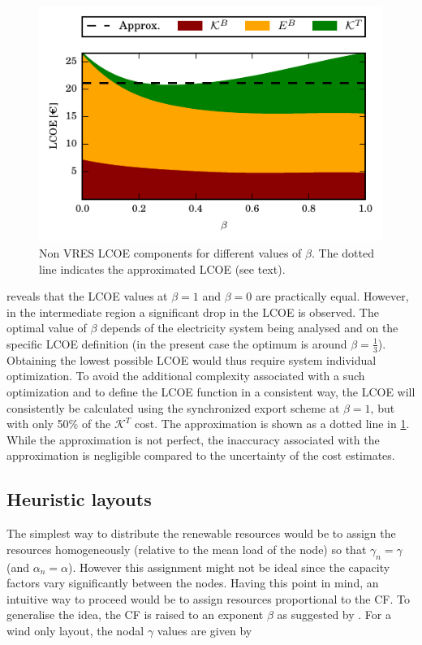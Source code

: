 \documentclass[a4paper, 5p, sort&compress]{elsarticle}%
\begin{document}
\begin{figure}[h!]
  \centering
  \includegraphics[width = \columnwidth]{constrainedSync}
  \caption{Non VRES LCOE components for different values of $\beta$. The
    dotted line indicates the approximated LCOE (see text).}
  \label{fig:transmission-lcoe}
\end{figure}

 reveals that the LCOE values at
$\beta = 1$ and $\beta = 0$ are practically equal. However, in the
intermediate region a significant drop in the LCOE is observed. The
optimal value of $\beta$ depends of the electricity system being analysed
and on the specific LCOE definition (in the present case the optimum
is around $\beta= \frac{1}{3}$). Obtaining the lowest possible LCOE would
thus require system individual optimization. To avoid the additional
complexity associated with a such optimization and to define the
LCOE function in a consistent way, the LCOE will consistently be
calculated using the synchronized export scheme at $\beta=1$, but with
only 50\% of the $\mathcal{K}^{T}$ cost. The approximation is shown as
a dotted line in \cref{fig:transmission-lcoe}. While the approximation
is not perfect, the inaccuracy associated with the approximation is
negligible compared to the uncertainty of the cost estimates.

\subsection{Heuristic layouts}
\label{sec:heuristic-layouts}

The simplest way to distribute the renewable resources would be to
assign the resources homogeneously (relative to the mean load of the
node) so that $\gamma_{n} = \gamma$ (and $\alpha_{n} = \alpha$). However this assignment
might not be ideal since the capacity factors vary significantly
between the nodes. Having this point in mind, an intuitive way to
proceed would be to assign resources proportional to the CF. To
generalise the idea, the CF is raised to an exponent $\beta$ as suggested by
\cite{Rolando}. For a wind only layout, the nodal $\gamma$ values are given by
\end{document}
